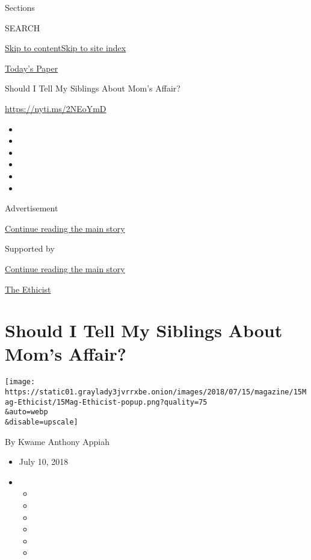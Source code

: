 Sections

SEARCH

\protect\hyperlink{site-content}{Skip to
content}\protect\hyperlink{site-index}{Skip to site index}

\href{https://myaccount.nytimes3xbfgragh.onion/auth/login?response_type=cookie\&client_id=vi}{}

\href{https://www.nytimes3xbfgragh.onion/section/todayspaper}{Today's
Paper}

Should I Tell My Siblings About Mom's Affair?

\url{https://nyti.ms/2NEoYmD}

\begin{itemize}
\item
\item
\item
\item
\item
\item
\end{itemize}

Advertisement

\protect\hyperlink{after-top}{Continue reading the main story}

Supported by

\protect\hyperlink{after-sponsor}{Continue reading the main story}

\href{/column/the-ethicist}{The Ethicist}

\hypertarget{should-i-tell-my-siblings-about-moms-affair}{%
\section{Should I Tell My Siblings About Mom's
Affair?}\label{should-i-tell-my-siblings-about-moms-affair}}

\texttt{[image: https://static01.graylady3jvrrxbe.onion/images/2018/07/15/magazine/15Mag-Ethicist/15Mag-Ethicist-popup.png?quality=75\\\&auto=webp\\\&disable=upscale]}

By Kwame Anthony Appiah

\begin{itemize}
\item
  July 10, 2018
\item
  \begin{itemize}
  \item
  \item
  \item
  \item
  \item
  \item
  \end{itemize}
\end{itemize}


